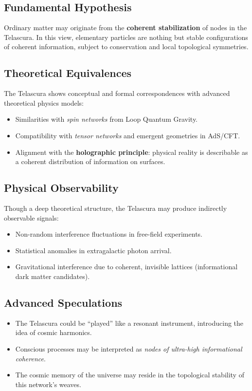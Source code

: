 \documentclass[12pt]{article}
\begin{document}
\subsection*{Fundamental Hypothesis}
Ordinary matter may originate from the \textbf{coherent stabilization} of nodes in the Telascura. In this view, elementary particles are nothing but stable configurations of coherent information, subject to conservation and local topological symmetries.

\subsection*{Theoretical Equivalences}
The Telascura shows conceptual and formal correspondences with advanced theoretical physics models:
\begin{itemize}
    \item Similarities with \textit{spin networks} from Loop Quantum Gravity.
    \item Compatibility with \textit{tensor networks} and emergent geometries in AdS/CFT.
    \item Alignment with the \textbf{holographic principle}: physical reality is describable as a coherent distribution of information on surfaces.
\end{itemize}

\subsection*{Physical Observability}
Though a deep theoretical structure, the Telascura may produce indirectly observable signals:
\begin{itemize}
    \item Non-random interference fluctuations in free-field experiments.
    \item Statistical anomalies in extragalactic photon arrival.
    \item Gravitational interference due to coherent, invisible lattices (informational dark matter candidates).
\end{itemize}

\subsection*{Advanced Speculations}
\begin{itemize}
    \item The Telascura could be “played” like a resonant instrument, introducing the idea of cosmic harmonics.
    \item Conscious processes may be interpreted as \textit{nodes of ultra-high informational coherence}.
    \item The cosmic memory of the universe may reside in the topological stability of this network's weaves.
\end{itemize}
\end{document}

